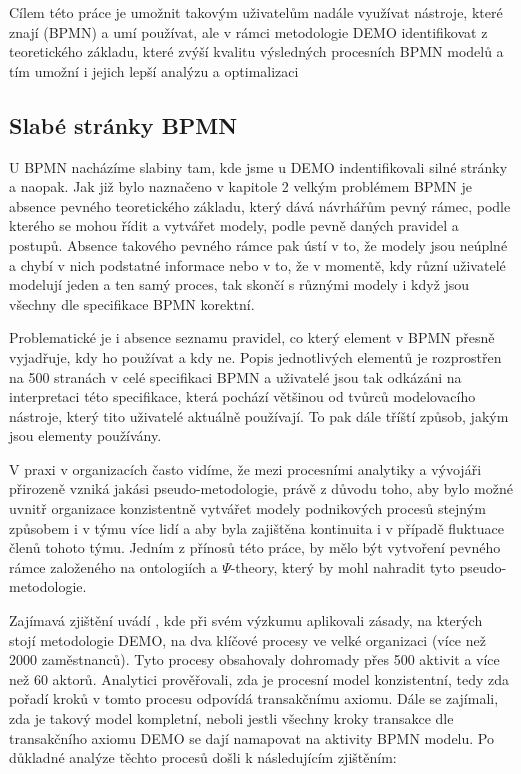 \documentclass[]{article}
\newcommand{\ptheory}{$\Psi$-theory}
\begin{document}
Cílem této práce je umožnit takovým uživatelům nadále využívat nástroje, které znají (BPMN) a umí používat, ale v rámci metodologie DEMO identifikovat  z teoretického základu, které zvýší kvalitu výsledných procesních BPMN modelů a tím umožní i jejich lepší analýzu a optimalizaci

\subsection{Slabé stránky BPMN}
U BPMN nacházíme slabiny tam, kde jsme u DEMO indentifikovali silné stránky a naopak. Jak již bylo naznačeno v kapitole 2 velkým problémem BPMN je absence pevného teoretického základu, který dává návrhářům pevný rámec, podle kterého se mohou řídit a vytvářet modely, podle pevně daných pravidel a postupů. Absence takového pevného rámce pak ústí v to, že modely jsou neúplné a chybí v nich podstatné informace nebo v to, že v momentě, kdy různí uživatelé modelují jeden a ten samý proces, tak skončí s různými modely i když jsou všechny dle specifikace BPMN korektní.

Problematické je i absence seznamu pravidel, co který element v BPMN přesně vyjadřuje, kdy ho používat a kdy ne. Popis jednotlivých elementů je rozprostřen na 500 stranách v celé specifikaci BPMN \cite{Silver2011} a uživatelé jsou tak odkázáni na interpretaci této specifikace, která pochází většinou od tvůrců modelovacího nástroje, který tito uživatelé aktuálně používají. To pak dále tříští způsob, jakým jsou elementy používány.

V praxi v organizacích často vidíme, že mezi procesními analytiky a vývojáři přirozeně vzniká jakási pseudo-metodologie, právě z důvodu toho, aby bylo možné uvnitř organizace konzistentně vytvářet modely podnikových procesů stejným způsobem i v týmu více lidí a aby byla zajištěna kontinuita i v případě fluktuace členů tohoto týmu. Jedním z přínosů této práce, by mělo být vytvoření pevného rámce založeného na ontologiích a \ptheory, který by mohl nahradit tyto pseudo-metodologie.

Zajímavá zjištění uvádí \cite{Caetano2012}, kde při svém výzkumu aplikovali zásady, na kterých stojí metodologie DEMO, na dva klíčové procesy ve velké organizaci (více než 2000 zaměstnanců). Tyto procesy obsahovaly dohromady přes 500 aktivit a více než 60 aktorů. Analytici prověřovali, zda je procesní model konzistentní, tedy zda pořadí kroků v tomto procesu odpovídá transakčnímu axiomu. Dále se zajímali, zda je takový model kompletní, neboli jestli všechny kroky transakce dle transakčního axiomu DEMO se dají namapovat na aktivity BPMN modelu. Po důkladné analýze těchto procesů došli k následujícím zjištěním:
\end{document}
